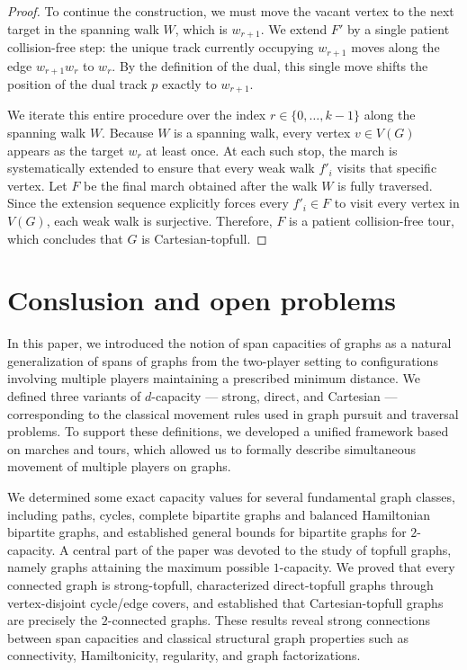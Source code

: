 \documentclass{article}
\begin{document}
\begin{proof}
To continue the construction, we must move the vacant vertex to the next target in the spanning walk $W$, which is $w_{r+1}$. We extend $F'$ by a single patient collision-free step: the unique track currently occupying $w_{r+1}$ moves along the edge $w_{r+1}w_r$ to $w_r$. By the definition of the dual, this single move shifts the position of the dual track $p$ exactly to $w_{r+1}$. 

We iterate this entire procedure over the index $r \in \{0, \ldots, k-1\}$ along the spanning walk $W$. Because $W$ is a spanning walk, every vertex $v \in V(G)$ appears as the target $w_r$ at least once. At each such stop, the march is systematically extended to ensure that every weak walk $f'_i$ visits that specific vertex. Let $F$ be the final march obtained after the walk $W$ is fully traversed. Since the extension sequence explicitly forces every $f'_i \in F$ to visit every vertex in $V(G)$, each weak walk is surjective. Therefore, $F$ is a patient collision-free tour, which concludes that $G$ is Cartesian-topfull.
\end{proof}

\section{Conslusion and open problems}

In this paper, we introduced the notion of span capacities of graphs as a natural generalization of spans of graphs from the two-player setting to configurations involving multiple players maintaining a prescribed minimum distance. We defined three variants of $d$-capacity — strong, direct, and Cartesian — corresponding to the classical movement rules used in graph pursuit and traversal problems. To support these definitions, we developed a unified framework based on marches and tours, which allowed us to formally describe simultaneous movement of multiple players on graphs.

We determined some exact capacity values for several fundamental graph classes, including paths, cycles, complete bipartite graphs and balanced Hamiltonian bipartite graphs, and established general bounds for bipartite graphs for $2$-capacity. A central part of the paper was devoted to the study of topfull graphs, namely graphs attaining the maximum possible $1$-capacity. We proved that every connected graph is strong-topfull, characterized direct-topfull graphs through vertex-disjoint cycle/edge covers, and established that Cartesian-topfull graphs are precisely the $2$-connected graphs. These results reveal strong connections between span capacities and classical structural graph properties such as connectivity, Hamiltonicity, regularity, and graph factorizations.
\end{document}
